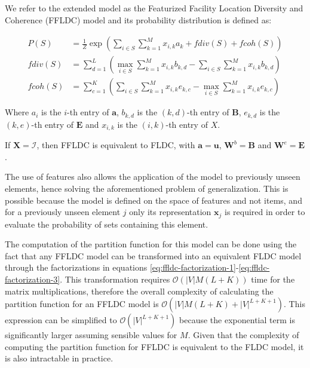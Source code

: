 We refer to the extended model as the Featurized Facility Location Diversity and Coherence (FFLDC) model and its probability distribution is defined as:

\begin{align}
  \tag{FFLDC} \label{eq:ffldc}
  P(S) &= \frac{1}{Z}\exp{\left(\sum_{i \in S}{\sum_{k=1}^{M}x_{i,k}a_{k}} + fdiv(S) + fcoh(S)\right)} \\
  fdiv(S) &= \sum_{d=1}^{L}{\left(\max_{i \in S}{\sum_{k=1}^{M}x_{i,k}b_{k,d}} - \sum_{i \in S}{\sum_{k=1}^{M}x_{i,k}b_{k,d}}\right)} \\
  fcoh(S) &= \sum_{c=1}^{K}{\left(\sum_{i \in S}{\sum_{k=1}^{M}x_{i,k}e_{k,c}} - \max_{i \in S}{\sum_{k=1}^{M}x_{i,k}e_{k,c}}\right)}
\end{align}

Where $a_{i}$ is the $i$-th entry of $\mathbf{a}$, $b_{k,d}$ is the $(k,d)$-th entry of $\mathbf{B}$, $e_{k,d}$ is the $(k,e)$-th entry of $\mathbf{E}$ and $x_{i,k}$ is the $(i,k)$-th entry of $X$.

\begin{remark}
  If $\mathbf{X} = \mathcal{I}$, then FFLDC is equivalent to FLDC, with $\mathbf{a} = \mathbf{u}$, $\mathbf{W}^{b} = \mathbf{B}$ and $\mathbf{W}^{e} = \mathbf{E}$.
\end{remark}

The use of features also allows the application of the model to previously unseen elements, hence solving the aforementioned problem of generalization. This is possible because the model is defined on the space of features and not items, and for a previously unseen element $j$ only its representation $\mathbf{x}_{j}$ is required in order to evaluate the probability of sets containing this element.

The computation of the partition function for this model can be done using the fact that any FFLDC model can be transformed into an equivalent FLDC model through the factorizations in equations \eqref{eq:ffldc-factorization-1}-\eqref{eq:ffldc-factorization-3}. This transformation requires $\mathcal{O}(|V|M(L+K))$ time for the matrix multiplications, therefore the overall complexity of calculating the partition function for an FFLDC model is $\mathcal{O}(|V|M(L+K) + |V|^{L+K+1})$. This expression can be simplified to $\mathcal{O}(|V|^{L+K+1})$ because the exponential term is significantly larger assuming sensible values for $M$. Given that the complexity of computing the partition function for FFLDC is equivalent to the FLDC model, it is also intractable in practice.

